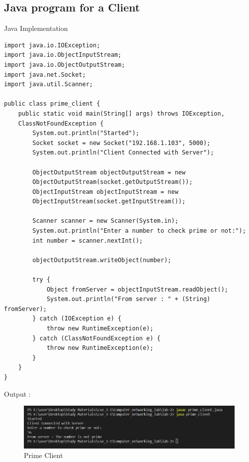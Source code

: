 \documentclass[11pt]{article}
\begin{document}
\subsection{Java program for a Client }
Java Implementation \\[2pt]
\begin{verbatim}
import java.io.IOException;
import java.io.ObjectInputStream;
import java.io.ObjectOutputStream;
import java.net.Socket;
import java.util.Scanner;

public class prime_client {
    public static void main(String[] args) throws IOException, 
    ClassNotFoundException {
        System.out.println("Started");
        Socket socket = new Socket("192.168.1.103", 5000);
        System.out.println("Client Connected with Server");

        ObjectOutputStream objectOutputStream = new 
        ObjectOutputStream(socket.getOutputStream());
        ObjectInputStream objectInputStream = new 
        ObjectInputStream(socket.getInputStream());

        Scanner scanner = new Scanner(System.in);
        System.out.println("Enter a number to check prime or not:");
        int number = scanner.nextInt();

        objectOutputStream.writeObject(number);

        try {
            Object fromServer = objectInputStream.readObject();
            System.out.println("From server : " + (String) fromServer);
        } catch (IOException e) {
            throw new RuntimeException(e);
        } catch (ClassNotFoundException e) {
            throw new RuntimeException(e);
        }
    }
}
\end{verbatim}




 Output : 
\begin{figure}[!h]
\centering
\includegraphics[width=\textwidth]{prime_client.png}
\caption{Prime Client}
\end{figure}
\FloatBarrier
\end{document}
